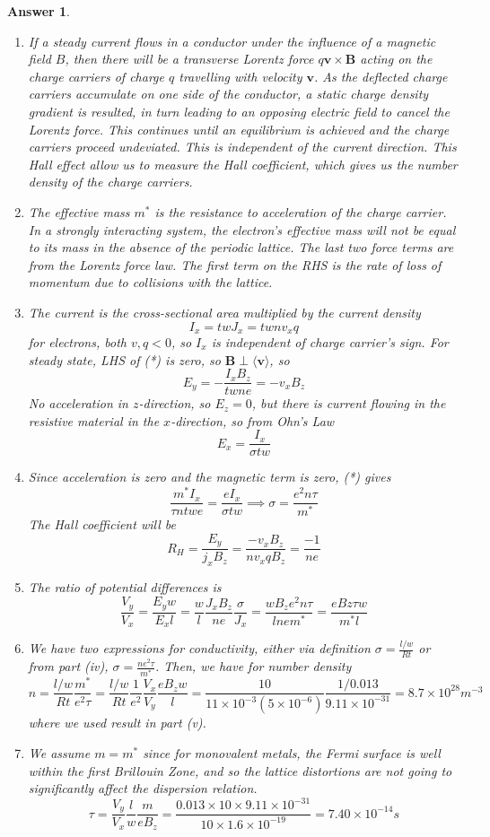 \documentclass[a4paper]{article}
\newtheorem{ans}{Answer}[subsection]
\theoremstyle{new}
\begin{document}
\begin{ans}\leavevmode
\begin{enumerate}[label=(\roman*)]
\item If a steady current flows in a conductor under the influence of a magnetic field $B$, then there will be a transverse Lorentz force $q\mathbf{v}\times\mathbf{B}$ acting on the charge carriers of charge $q$ travelling with velocity $\mathbf{v}$. As the deflected charge carriers accumulate on one side of the conductor, a static charge density gradient is resulted, in turn leading to an opposing electric field to cancel the Lorentz force. This continues until an equilibrium is achieved and the charge carriers proceed undeviated. This is independent of the current direction. This Hall effect allow us to measure the Hall coefficient, which gives us the number density of the charge carriers. 
\item The effective mass $m^*$ is the resistance to acceleration of the charge carrier. In a strongly interacting system, the electron's effective mass will not be equal to its mass in the absence of the periodic lattice. The last two force terms are from the Lorentz force law. The first term on the RHS is the rate of loss of momentum due to collisions with the lattice.
\item The current is the cross-sectional area multiplied by the current density
$$I_x=twJ_x=twnv_xq$$
for electrons, both $v,q<0$, so $I_x$ is independent of charge carrier's sign. For steady state, LHS of (*) is zero, so $\mathbf{B}\perp\langle\mathbf{v}\rangle$, so 
$$E_y=-\frac{I_xB_z}{twne}=-v_xB_z$$
No acceleration in $z$-direction, so $E_z=0$, but there is current flowing in the resistive material in the $x$-direction, so from Ohn's Law
$$E_x=\frac{I_x}{\sigma tw}$$
\item Since acceleration is zero and the magnetic term is zero, (*) gives
$$\frac{m^*I_x}{\tau ntwe}=\frac{eI_x}{\sigma tw}\implies\sigma=\frac{e^2n\tau}{m^*}$$
The Hall coefficient will be
$$R_H=\frac{E_y}{j_xB_z}=\frac{-v_xB_z}{nv_xqB_z}=\frac{-1}{ne}$$
\item The ratio of potential differences is
$$\frac{V_y}{V_x}=\frac{E_yw}{E_xl}=\frac{w}{l}\frac{J_xB_z}{ne}\frac{\sigma}{J_x}=\frac{wB_ze^2n\tau}{lnem^*}=\frac{eBz\tau w}{m^*l}$$
\item We have two expressions for conductivity, either via definition $\sigma=\frac{l/w}{Rt}$ or from part (iv), $\sigma=\frac{ne^2\tau}{m^*}$. Then, we have for number density
$$n=\frac{l/w}{Rt}\frac{m^*}{e^2\tau}=\frac{l/w}{Rt}\frac{1}{e^2}\frac{V_x}{V_y}\frac{eB_zw}{l}=\frac{10}{11\times10^{-3}(5\times10^{-6})}\frac{1/0.013}{9.11\times10^{-31}}=8.7\times10^{28}m^{-3}$$
where we used result in part (v).
\item We assume $m=m^*$ since for monovalent metals, the Fermi surface is well within the first Brillouin Zone, and so the lattice distortions are not going to significantly affect the dispersion relation.
$$\tau=\frac{V_y}{V_x}\frac{l}{w}\frac{m}{eB_z}=\frac{0.013\times 10\times 9.11\times10^{-31}}{10\times 1.6\times10^{-19}}=7.40\times10^{-14}s$$

\end{enumerate}
\end{ans}
\end{document}
